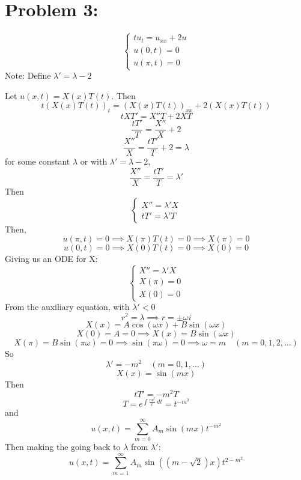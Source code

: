 \documentclass[12pt]{article}
\begin{document}
\section*{Problem 3:}
\[\begin{cases}
    tu_{t}= u_{xx} + 2u\\
    u(0, t) = 0\\
    u(\pi, t) = 0
\end{cases}\]
Note: Define $\lambda' = \lambda - 2$

\color{blue}
Let $u(x, t) = X(x)T(t)$. Then 
\[t(X(x)T(t))_t = (X(x)T(t))_{xx} + 2(X(x)T(t))\]
\[tXT' = X''T + 2XT\]
\[\frac{tT'}{T} = \frac{X''}{X} + 2\]
\[\frac{X''}{X} = \frac{tT'}{T} + 2 = \lambda\]
for some constant $\lambda$ or with $\lambda' = \lambda - 2$,
\[\frac{X''}{X} = \frac{tT'}{T} = \lambda'\] 
Then 
\[\begin{cases}
    X'' = \lambda' X\\
    tT' = \lambda' T
\end{cases}\]
Then,
\[u(\pi, t) = 0 \implies X(\pi)T(t) = 0 \implies X(\pi) = 0\]
\[u(0, t) = 0\implies X(0)T(t) = 0 \implies X(0) = 0\]
Giving us an ODE for X:
\[\begin{cases}
    X'' = \lambda' X\\
    X(\pi) = 0\\
    X(0) = 0
\end{cases}\]
From the auxiliary equation, with $\lambda' < 0$
\[r^2 = \lambda \implies r = \pm \omega i \]
\[X(x) = A\cos(\omega x)+ B\sin(\omega x)\]
\[X(0) = A = 0 \implies X(x) = B\sin(\omega x)\]
\[X(\pi) = B\sin(\pi \omega) = 0 \implies \sin(\pi \omega) = 0 \implies \omega = m \quad (m = 0, 1, 2, ...)\]
So 
\[\lambda' = -m^2 \quad (m = 0, 1, ...)\]
\[X(x) = \sin(mx)\]
Then 
\[tT' = -m^2T\]
\[T = e^{\int \frac{m^2}{t}\; dt} = t^{-m^2}\]
and 
\[u(x, t) = \sum_{m=0}^\infty A_m\sin(mx) t^{- m^2}\]
Then making the going back to $\lambda$ from $\lambda'$:
\[\boxed{u(x, t) = \sum_{m=1}^\infty A_m\sin((m - \sqrt{2})x) t^{2-m^2}}\]
\color{black}
\pagebreak
\end{document}
